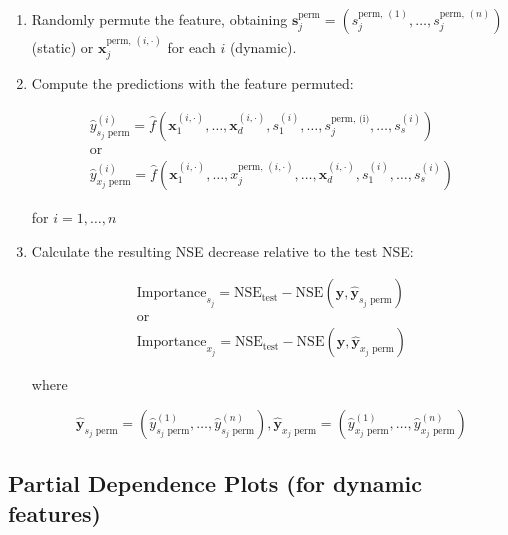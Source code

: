 \documentclass[
]{krantz}
\begin{document}
\begin{enumerate}
\def\labelenumi{\arabic{enumi}.}
\item
  Randomly permute the feature, obtaining \(\boldsymbol s_j^{\text{perm}} = \left(s_j^{\text{perm},\, (1)}, \dots, s_j^{\text{perm},\, (n)}\right)\) (static) or \(\boldsymbol{x}_j^{\mathrm{perm}, \, (i, \cdot)}\) for each \(i\) (dynamic).
\item
  Compute the predictions with the feature permuted:

  \[
  \begin{gathered}
  \hat y_{s_j \text{ perm}}^{(i)} = \hat{f}\left(\boldsymbol x_1^{(i, \cdot)}, \dots, \boldsymbol x_d^{(i, \cdot)}, s_1^{(i)}, \dots, s_j^{\text{perm, (i)}}, \dots, s_s^{(i)}\right) \\[4pt]
  \text{or} \\[4pt]
  \hat y_{x_j \text{ perm}}^{(i)} = \hat{f}\left(\boldsymbol x_1^{(i, \cdot)}, \dots, x_j^{\text{perm}, \, (i, \cdot)}, \dots, \boldsymbol x_d^{(i, \cdot)}, s_1^{(i)}, \dots, s_s^{(i)}\right)
  \end{gathered}
  \]

  for \(i = 1, \dots, n\)
\item
  Calculate the resulting NSE decrease relative to the test NSE:

  \[
  \begin{gathered}
  \mathrm{Importance}_{s_j} = \mathrm{NSE}_{\text{test}} - \mathrm{NSE}(\boldsymbol y, \boldsymbol{\hat{y}}_{s_j \text{ perm}}) \\[4pt]
  \text{or} \\[4pt]
  \mathrm{Importance}_{x_j} = \mathrm{NSE_{\mathrm{test}}} - \mathrm{NSE}(\boldsymbol y, \boldsymbol{\hat y}_{x_j \text{ perm}})
  \end{gathered}
  \]

  where

  \[
  \boldsymbol{\hat{y}}_{s_j \text{ perm}} = \left(\hat y_{s_j \text{ perm}}^{(1)}, \dots, \hat y_{s_j \text{ perm}}^{(n)}\right), \boldsymbol{\hat y}_{x_j \text{ perm}} = \left(\hat y_{x_j \text{ perm}}^{(1)}, \dots, \hat y_{x_j \text{ perm}}^{(n)}\right)
  \]
\end{enumerate}

\newpage

\subsection{Partial Dependence Plots (for dynamic features)}\label{partial-dependence-plots-for-dynamic-features}
\end{document}
